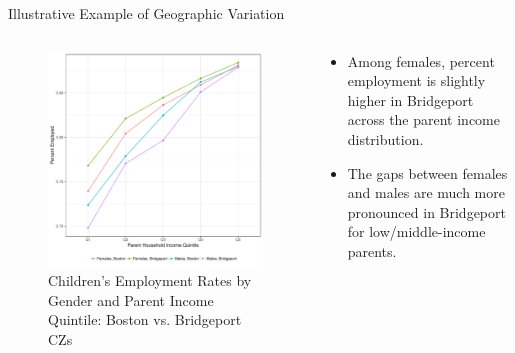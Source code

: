 \documentclass{beamer}
\begin{document}
\begin{frame}{Illustrative Example of Geographic Variation}
\begin{columns}
	
	\begin{column}{0.52\textwidth}
		\vspace{\topsep}
		\begin{figure}
			\vspace{-0.5cm}	
			\includegraphics[width=\columnwidth]{../fig2_new.pdf}
			\caption{{\scriptsize Children’s Employment Rates by Gender and Parent Income Quintile:
					Boston vs. Bridgeport CZs}}
		\end{figure}	
	\end{column}
	
	\begin{column}{0.4\textwidth}
		\vspace{-2.5cm}	
		\begin{itemize}
			\item Among females, percent employment is slightly higher in Bridgeport across the parent income distribution. 
			\item The gaps between females and males are much more pronounced in Bridgeport for low/middle-income parents.
		\end{itemize}
	\end{column}
	
\end{columns}
\end{frame}
\end{document}
